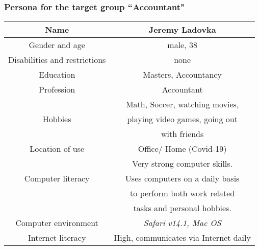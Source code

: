 \documentclass{beamer}
\begin{document}
\begin{frame}
    \frametitle{Persona for the target group ``Accountant"}
    \begin{tabular}{ |c|c| } 
        \hline
        Name                          & Jeremy Ladovka \\ \hline
        Gender and age                & male, 38 \\ \hline
        Disabilities and restrictions & none \\ \hline
        Education                     & Masters, Accountancy \\ \hline
        Profession                    & Accountant \\ \hline
                                      & Math, Soccer, watching movies, \\ 
        Hobbies                       & playing video games, going out \\
                                      & with friends \\ \hline
        Location of use               & Office/ Home (Covid-19) \\ \hline
                                      & Very strong computer skills. \\
        Computer literacy             & Uses computers on a daily basis \\ 
                                      & to perform both work related \\
                                      & tasks and personal hobbies. \\ \hline
        Computer environment          & \textit{Safari v14.1, Mac OS} \\ \hline
        Internet literacy             & High, communicates via Internet daily \\ \hline
    \end{tabular}
\end{frame}
\end{document}
